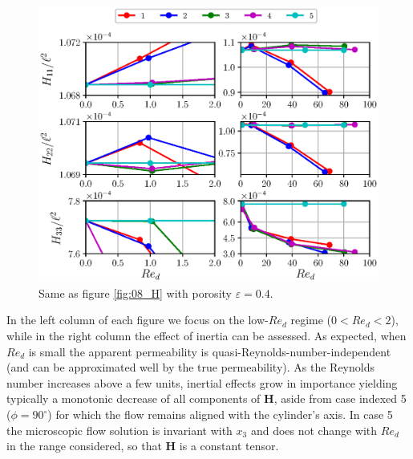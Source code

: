 \begin{figure}[H]
	\centering
	\includegraphics[width=1\textwidth]{chapter_4/figure/H_of04}
	\caption{Same as figure \ref{fig:08_H} with porosity $\varepsilon=0.4$.}
	\label{fig:04_H}
\end{figure}

%   
%



In the left column of each figure we focus on the low-$Re_d$ regime ($0 < Re_d < 2$), while in the right column the effect of inertia can be 
assessed.  As expected, when $Re_d$ is small the apparent permeability is quasi-Reynolds-number-independent (and can be approximated well by 
the true permeability). As the Reynolds number increases above a few units, inertial effects grow in importance yielding typically a monotonic decrease of all 
components of $\mathbf{H}$, aside from case indexed 5 ($\phi=90^{\circ}$) for which the flow remains aligned with the cylinder's axis. In case 5 the 
microscopic flow solution is invariant with $x_3$ and does not change with $Re_d$ in the range considered, so that $\mathbf{H}$ is a  
constant tensor.

